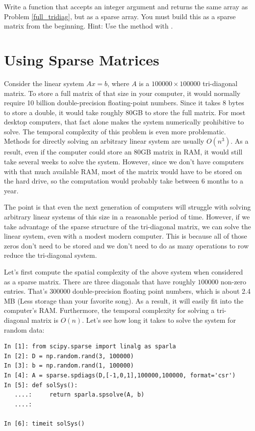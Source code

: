 \begin{problem}
Write a function that accepts an integer argument  and returns the same array as Problem \ref{full_tridiag}, but as a sparse array.
You must build this as a sparse matrix from the beginning.
Hint: Use the  method with .
\label{prob:sparse_tridiag}
\end{problem}

\section*{Using Sparse Matrices}
Consider the linear system $A x = b$, where $A$ is a $100000\times 100000$ tri-diagonal matrix.
To store a full matrix of that size in your computer, it would normally require 10 billion double-precision floating-point numbers.  Since it takes 8 bytes to store a double, it would take roughly 80GB to store the full matrix.  For most desktop computers, that fact alone makes the system numerically prohibitive to solve.
The temporal complexity of this problem is even more problematic. Methods for directly solving an arbitrary linear system are usually $O(n^3)$. As a result, even if the computer could store an 80GB matrix in RAM, it would still take several weeks to solve the system.  However, since we don't have computers with that much available RAM, most of the
matrix would have to be stored on the hard drive, so the computation would probably take between $6$ months to a year.

The point is that even the next generation of computers will
struggle with solving arbitrary linear systems of this size in a reasonable period of time.  However, if we take advantage of the sparse structure of the tri-diagonal matrix, we can solve the linear system, even with a modest modern computer.  This is because all of those zeros don't need to be stored and we don't need to do as many operations to row reduce the tri-diagonal system.

Let's first compute the spatial complexity of the above system when considered as a sparse matrix.  There are three diagonals that have roughly $100000$ non-zero entries.  That's $300000$
double-precision floating point numbers, which is about 2.4 MB (Less storage than your favorite song).  As a result, it will easily fit into the computer's RAM.  Furthermore, the temporal complexity for solving a tri-diagonal matrix is $O(n)$. Let's see how long it takes to solve the system for random data:

\begin{lstlisting}
In [1]: from scipy.sparse import linalg as sparla
In [2]: D = np.random.rand(3, 100000)
In [3]: b = np.random.rand(1, 100000)
In [4]: A = sparse.spdiags(D,[-1,0,1],100000,100000, format='csr')
In [5]: def solSys():
   ....:     return sparla.spsolve(A, b)
   ....: 

In [6]: timeit solSys()

\end{lstlisting}


